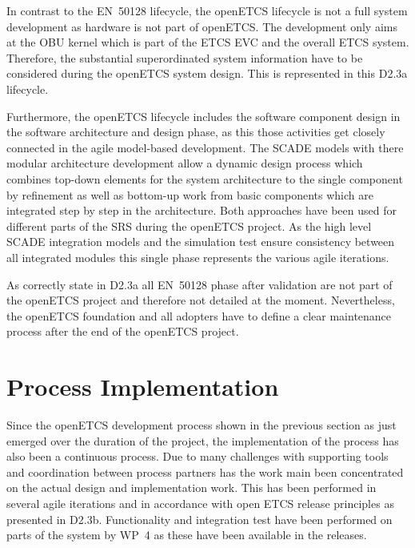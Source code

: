 \documentclass{template/openetcs_report}
\begin{document}
In contrast to the EN~50128 lifecycle, the openETCS lifecycle is not a full system development as hardware is not part of openETCS. The development only aims at the OBU kernel which is part of the  ETCS EVC and the overall ETCS system. Therefore, the substantial superordinated system information have to be considered during the openETCS system design. This is represented in this D2.3a lifecycle.

Furthermore, the openETCS lifecycle includes the software component design in the software architecture and design phase, as this those activities get closely connected in the agile model-based development. The SCADE models with there modular architecture development allow a dynamic design process which combines top-down elements for the system architecture to the single component by refinement as well as bottom-up work from basic components which are integrated step by step in the architecture. Both approaches have been used for different parts of the SRS during the openETCS project. As the high level SCADE integration models and the simulation test ensure consistency between all integrated modules this single phase represents the various agile iterations.

As correctly state in D2.3a all EN~50128 phase after validation are not part of the openETCS project and therefore not detailed at the moment. Nevertheless, the openETCS foundation and all adopters have to define a clear maintenance process after the end of the openETCS project. 

\section{Process Implementation}
\label{sec:proc-impl}

Since the openETCS development process shown in the previous section as just emerged over the duration of the project, the implementation of the process has also been a continuous process. Due to many challenges with supporting tools and coordination between process partners has the work main been concentrated on the actual design and implementation work. This has been performed in several agile iterations and in accordance with open ETCS release principles as presented in D2.3b. Functionality and integration test have been performed on parts of the system by WP~4 as these have been available in the releases.
\end{document}
